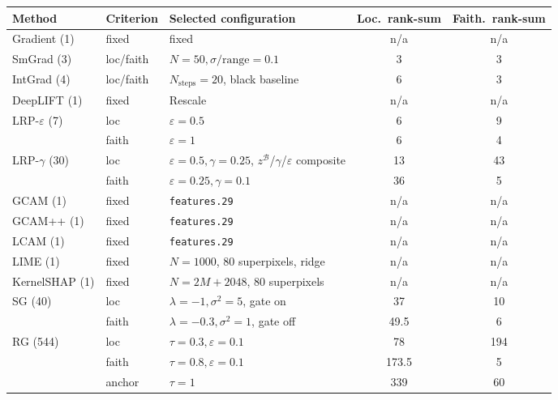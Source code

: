 \begin{tabular}{@{}l l l c c@{}}
\toprule
Method & Criterion & Selected configuration & Loc.\ rank-sum & Faith.\ rank-sum \\
\midrule
Gradient (1) & fixed & fixed & n/a & n/a \\
\addlinespace
SmGrad (3) & loc/faith & $N{=}50,\sigma/\mathrm{range}{=}0.1$ & 3 & 3 \\
\addlinespace
IntGrad (4) & loc/faith & $N_{\mathrm{steps}}{=}20$, black baseline & 6 & 3 \\
\addlinespace
DeepLIFT (1) & fixed & Rescale & n/a & n/a \\
\addlinespace
LRP-$\varepsilon$ (7) & loc & $\varepsilon{=}0.5$ & 6 & 9 \\
 & faith & $\varepsilon{=}1$ & 6 & 4 \\
\addlinespace
LRP-$\gamma$ (30) & loc & $\varepsilon{=}0.5,\gamma{=}0.25$, $z^{\mathcal{B}}$/$\gamma$/$\varepsilon$ composite & 13 & 43 \\
 & faith & $\varepsilon{=}0.25,\gamma{=}0.1$ & 36 & 5 \\
\addlinespace
GCAM (1) & fixed & \texttt{features.29} & n/a & n/a \\
\addlinespace
GCAM++ (1) & fixed & \texttt{features.29} & n/a & n/a \\
\addlinespace
LCAM (1) & fixed & \texttt{features.29} & n/a & n/a \\
\addlinespace
LIME (1) & fixed & $N{=}1000$, 80 superpixels, ridge & n/a & n/a \\
\addlinespace
KernelSHAP (1) & fixed & $N{=}2M{+}2048$, 80 superpixels & n/a & n/a \\
\addlinespace
SG (40) & loc & $\lambda{=}{-}1,\sigma^2{=}5$, gate on & 37 & 10 \\
 & faith & $\lambda{=}{-}0.3,\sigma^2{=}1$, gate off & 49.5 & 6 \\
\addlinespace
RG (544) & loc & $\tau{=}0.3,\varepsilon{=}0.1$ & 78 & 194 \\
 & faith & $\tau{=}0.8,\varepsilon{=}0.1$ & 173.5 & 5 \\
 & anchor & $\tau{=}1$ & 339 & 60 \\
\bottomrule
\end{tabular}
